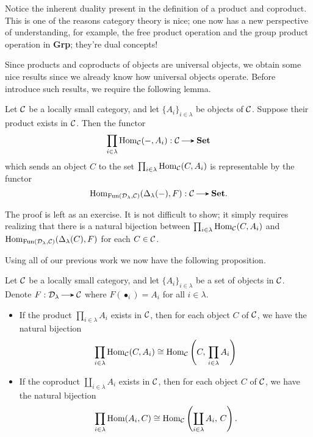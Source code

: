     \begin{remark}
        Notice the inherent duality present in the definition of a product and coproduct. 
        This is one of the reasons category theory is nice; one now has a new perspective of 
        understanding, for example, the free product operation and the 
        group product operation in \textbf{Grp}; they're dual concepts!
    \end{remark}

    Since products and coproducts of objects are universal objects, we obtain some 
    nice results since we already know how universal objects operate. Before introduce 
    such results, we require the following lemma. 

    \begin{lemma}\label{lemma:product_of_hom_sets}
        Let $\mathcal{C}$ be a locally small category, and let $\{A_i\}_{i \in \lambda}$ 
        be objects of $\mathcal{C}$. Suppose their product exists in $\mathcal{C}$. Then the functor 
        \[
            \prod_{i \in \lambda}\hom_{\cc}(-, A_i): \cc \to \textbf{Set}
        \]
        which sends an object $C$ to the set $\prod_{i \in \lambda}\operatorname{\mathrm{Hom}}_{\mathcal{C}}(C, A_i)$ 
        is representable by the functor 
        \[
            \hom_{\text{Fun}(\dd_{\lambda}, \cc)}(\Delta_{\lambda}(-), F): \cc \to \textbf{Set}.
        \]
    \end{lemma}

    The proof is left as an exercise. It is not difficult to show; it simply requires realizing that there 
    is a natural bijection between $\prod_{i \in \lambda}\operatorname{\mathrm{Hom}}_{\mathcal{C}}(C, A_i)$ and 
    $\operatorname{\mathrm{Hom}}_{\text{Fun}(\mathcal{D}_{\lambda}, \mathcal{C})}(\Delta_{\lambda}(C), F)$ for each $C \in \mathcal{C}$.

    Using all of our previous work we now have the following proposition.

    \begin{proposition}\label{proposition:product_coproduct_natural_bijection}
        Let $\mathcal{C}$ be a locally small category, and let $\{A_i\}_{i \in \lambda}$ be a set of objects in $\mathcal{C}$. 
        Denote $F: \dd_{\lambda} \to \cc$ where $F(\bullet_i) = A_i$ for all $i \in \lambda$.
        \begin{itemize}
            \item If the product $\prod_{i \in \lambda}A_i$ 
            exists in $\mathcal{C}$, then for each object 
            $C$ of $\mathcal{C}$, we have the natural bijection
            \[
                \prod_{i \in \lambda}\operatorname{\mathrm{Hom}}_{\mathcal{C}}(C, A_i) \cong \operatorname{\mathrm{Hom}}_{\mathcal{C}}\left(C,\, \prod_{i \in \lambda}A_i\right)
            \]

            \item If the coproduct $\coprod_{i \in \lambda}A_i$ exists 
            in $\mathcal{C}$, then for each object $C$ of $\mathcal{C}$, we have the natural bijection 
            \[
                \prod_{i \in \lambda}\operatorname{\mathrm{Hom}}(A_i, C)
                \cong 
                \operatorname{\mathrm{Hom}}_{\mathcal{C}}\left( \coprod_{i\in \lambda}A_i, \, C \right).
            \]
        \end{itemize}
    \end{proposition}

